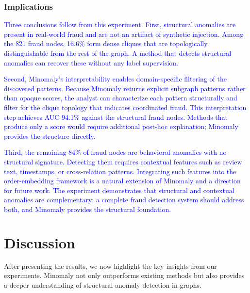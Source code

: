 \documentclass[preprint,12pt]{elsarticle}
\newcommand{\new}[1]{\textcolor{blue}{#1}}
\theoremstyle{plain}
\theoremstyle{definition}
\theoremstyle{remark}
\begin{document}
\subsubsection{Implications}

\new{Three conclusions follow from this experiment. First, structural anomalies are present in real-world fraud and are not an artifact of synthetic injection. Among the 821 fraud nodes, 16.6\% form dense cliques that are topologically distinguishable from the rest of the graph. A method that detects structural anomalies can recover these without any label supervision.}

\new{Second, Minomaly's interpretability enables domain-specific filtering of the discovered patterns. Because Minomaly returns explicit subgraph patterns rather than opaque scores, the analyst can characterize each pattern structurally and filter for the clique topology that indicates coordinated fraud. This interpretation step achieves AUC 94.1\% against the structural fraud nodes. Methods that produce only a score would require additional post-hoc explanation; Minomaly provides the structure directly.}

\new{Third, the remaining 84\% of fraud nodes are behavioral anomalies with no structural signature. Detecting them requires contextual features such as review text, timestamps, or cross-relation patterns. Integrating such features into the order-embedding framework is a natural extension of Minomaly and a direction for future work. The experiment demonstrates that structural and contextual anomalies are complementary: a complete fraud detection system should address both, and Minomaly provides the structural foundation.}

\section{Discussion}
\label{sec:discussion}

After presenting the results, we now highlight the key insights from our experiments. Minomaly not only outperforms existing methods but also provides a deeper understanding of structural anomaly detection in graphs.
\end{document}

